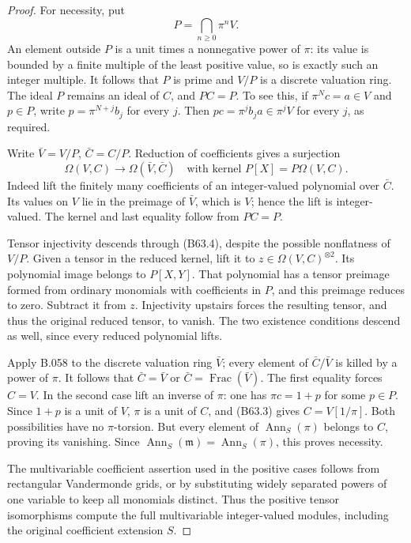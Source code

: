 \begin{proof}
For necessity, put
\[
                         P=\bigcap_{n\ge0}\pi^nV.
\]
An element outside $P$ is a unit times a
nonnegative power of $\pi$: its value is bounded
by a finite multiple of the least positive
value, so is exactly such an integer multiple.
It follows that $P$ is prime and $V/P$ is a
discrete valuation ring. The ideal $P$ remains
an ideal of $C$, and $PC=P$. To see this, if
$\pi^Nc=a\in V$ and $p\in P$, write
$p=\pi^{N+j}b_j$ for every $j$. Then
$pc=\pi^jb_ja\in\pi^jV$ for every $j$, as required.

Write $\bar V=V/P$, $\bar C=C/P$. Reduction of
coefficients gives a surjection
\[
 \Omega(V,C)\longrightarrow\Omega(\bar V,\bar C)
 \quad\text{with kernel }P[X]=P\Omega(V,C).              \tag{B63.4}
\]
Indeed lift the finitely many coefficients of
an integer-valued polynomial over $\bar C$.
Its values on $V$ lie in the preimage of
$\bar V$, which is $V$; hence the lift is
integer-valued. The kernel and last equality
follow from $PC=P$.

Tensor injectivity descends through (B63.4),
despite the possible nonflatness of $V/P$.
Given a tensor in the reduced kernel, lift it
to $z\in\Omega(V,C)^{\otimes2}$. Its polynomial
image belongs to $P[X,Y]$. That polynomial
has a tensor preimage formed from ordinary
monomials with coefficients in $P$, and this
preimage reduces to zero. Subtract it from $z$.
Injectivity upstairs forces the resulting tensor,
and thus the original reduced tensor, to vanish.
The two existence conditions descend as well,
since every reduced polynomial lifts.

Apply B.058 to the discrete valuation ring
$\bar V$; every element of $\bar C/\bar V$ is
killed by a power of $\pi$. It follows that
$\bar C=\bar V$ or $\bar C=\operatorname{Frac}(\bar V)$.
The first equality forces $C=V$. In the second
case lift an inverse of $\pi$: one has
$\pi c=1+p$ for some $p\in P$. Since $1+p$
is a unit of $V$, $\pi$ is a unit of $C$,
and (B63.3) gives $C=V[1/\pi]$.
Both possibilities have no $\pi$-torsion.
But every element of $\operatorname{Ann}_S(\pi)$
belongs to $C$, proving its vanishing.
Since $\operatorname{Ann}_S(\mathfrak m)=
\operatorname{Ann}_S(\pi)$, this proves necessity.

The multivariable coefficient assertion used in
the positive cases follows from rectangular
Vandermonde grids, or by substituting widely
separated powers of one variable to keep all
monomials distinct. Thus the positive tensor
isomorphisms compute the full multivariable
integer-valued modules, including the original
coefficient extension $S$.
\end{proof}

